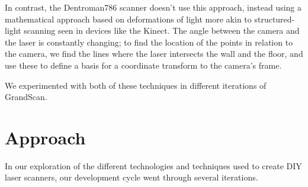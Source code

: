 \documentclass[12pt, letterpaper]{article}
\begin{document}
In contrast, the Dentroman786 scanner doesn't use this approach, instead using a mathematical approach based on deformations of light more akin to structured-light scanning seen in devices like the Kinect. The angle between the camera and the laser is constantly changing; to find the location of the points in relation to the camera, we find the lines where the laser intersects the wall and the floor, and use these to define a basis for a coordinate transform to the camera's frame.

We experimented with both of these techniques in different iterations of GrandScan.

\section{Approach}

In our exploration of the different technologies and techniques used to create DIY laser scanners, our development cycle went through several iterations.
\end{document}

